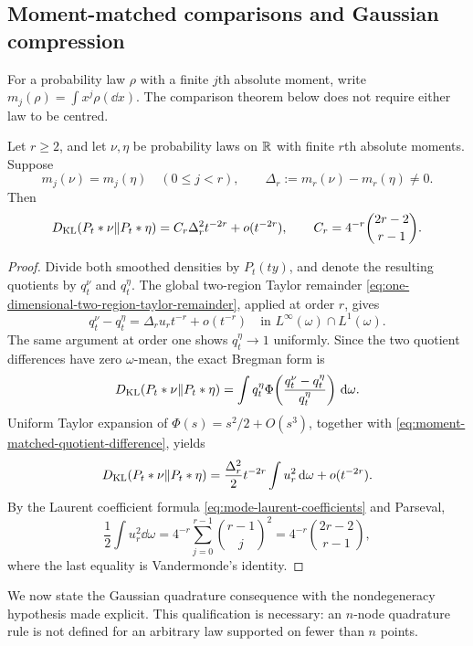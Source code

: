 \subsection{Moment-matched comparisons and Gaussian compression}

For a probability law \(\rho\) with a finite \(j\)th absolute moment, write
\(m_j(\rho)=\int x^j\rho(\dd x)\).  The comparison theorem below does not
require either law to be centred.

\begin{theorem}
\label{thm:moment-matched-poisson-kl}
Let \(r\ge2\), and let \(\nu,\eta\) be probability laws on \(\mathbb{R}\) with
finite \(r\)th absolute moments.  Suppose
\[
 m_j(\nu)=m_j(\eta)\quad(0\le j<r),
 \qquad \Delta_r:=m_r(\nu)-m_r(\eta)\ne0.
\]
Then
\begin{equation}\label{eq:moment-matched-poisson-kl}
 D_{\rm KL}(P_t*\nu\|P_t*\eta)
 =C_r\Delta_r^2t^{-2r}+o(t^{-2r}),
 \qquad
 C_r=4^{-r}\binom{2r-2}{r-1}.
\end{equation}
\end{theorem}

\begin{proof}
Divide both smoothed densities by \(P_t(ty)\), and denote the resulting
quotients by \(q_t^\nu\) and \(q_t^\eta\).  The global two-region Taylor
remainder \eqref{eq:one-dimensional-two-region-taylor-remainder}, applied
at order \(r\), gives
\begin{equation}\label{eq:moment-matched-quotient-difference}
 q_t^\nu-q_t^\eta
 =\Delta_r u_r t^{-r}+o(t^{-r})
 \quad\text{in }L^\infty(\omega)\cap L^1(\omega).
\end{equation}
The same argument at order one shows \(q_t^\eta\to1\) uniformly.  Since the
two quotient differences have zero \(\omega\)-mean, the exact Bregman form is
\[
 D_{\rm KL}(P_t*\nu\|P_t*\eta)
 =\int q_t^\eta
 \Phi\!\left(\frac{q_t^\nu-q_t^\eta}{q_t^\eta}\right)\,\mathrm{d}\omega.
\]
Uniform Taylor expansion of \(\Phi(s)=s^2/2+O(s^3)\), together with
\eqref{eq:moment-matched-quotient-difference}, yields
\[
 D_{\rm KL}(P_t*\nu\|P_t*\eta)
 =\frac{\Delta_r^2}{2}t^{-2r}\int u_r^2\,\mathrm{d}\omega+o(t^{-2r}).
\]
By the Laurent coefficient formula
\eqref{eq:mode-laurent-coefficients} and Parseval,
\[
 \frac12\int u_r^2\dd\omega
 =4^{-r}\sum_{j=0}^{r-1}\binom{r-1}{j}^2
 =4^{-r}\binom{2r-2}{r-1},
\]
where the last equality is Vandermonde's identity.
\end{proof}

We now state the Gaussian quadrature consequence with the nondegeneracy
hypothesis made explicit.  This qualification is necessary: an \(n\)-node
quadrature rule is not defined for an arbitrary law supported on fewer than
\(n\) points.

